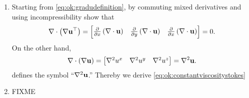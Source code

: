 \renewcommand{\labelenumi}{\arabic{chapter}.\arabic{enumi}\quad}
\begin{enumerate}

\item \label{exer:ok:constantviscositystokes}  Starting from \eqref{eq:ok:gradudefinition}, by commuting mixed derivatives and using incompressibility show that
\begin{equation*}
\nabla\cdot \left(\nabla \mathbf{u}^{\top}\right) = \begin{bmatrix}
    \frac{\partial}{\partial x}\left(\nabla\cdot \mathbf{u}\right) & \frac{\partial}{\partial y }\left(\nabla\cdot \mathbf{u}\right) & \frac{\partial}{\partial x} \left(\nabla\cdot \mathbf{u}\right)
    \end{bmatrix}
    = 0.
\end{equation*}
On the other hand,
\begin{equation*}
\nabla\cdot \left(\nabla \mathbf{u}\right) = \begin{bmatrix} \nabla^2 u^x & \nabla^2 u^y & \nabla^2 u^z \end{bmatrix} = \nabla^2 \mathbf{u}.
\end{equation*}
defines the symbol ``$\nabla^2 \mathbf{u}$.''  Thereby we derive \eqref{eq:ok:constantviscositystokes}

\item \label{exer:ok:smalldetails}  FIXME

\end{enumerate}
